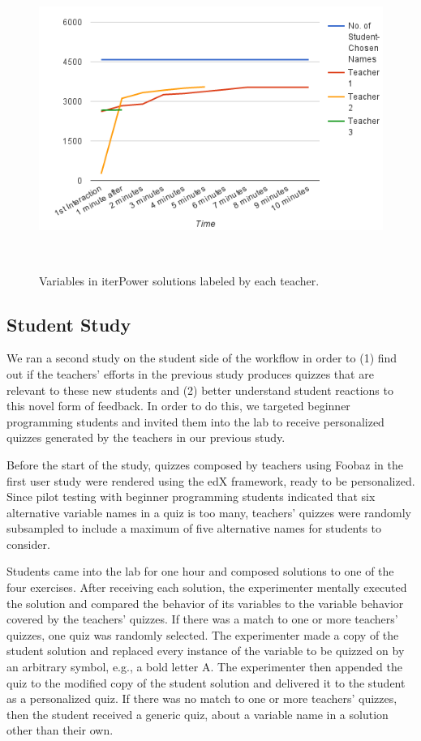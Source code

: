 \begin{figure}
\begin{minipage}{1\columnwidth}
\centering
\includegraphics[width=0.9\columnwidth]{Body/figures/foobaz/variableCoverageNoTitle.png}
\caption{Variables in iterPower solutions labeled by each teacher.}~\label{fig:variableCoverage}
\end{minipage}
\end{figure}

\subsection{Student Study}

We ran a second study on the student side of the workflow in order to (1) find out if the teachers' efforts in the previous study produces quizzes that are relevant to these new students and (2) better understand student reactions to this novel form of feedback. In order to do this, we targeted beginner programming students and invited them into the lab to receive personalized quizzes generated by the teachers in our previous study.

Before the start of the study, quizzes composed by teachers using Foobaz in the first user study were rendered using the edX framework, ready to be personalized. Since pilot testing with beginner programming students indicated that six alternative variable names in a quiz is too many, teachers' quizzes were randomly subsampled to include a maximum of five alternative names for students to consider. 

Students came into the lab for one hour and composed solutions to one of the four exercises. After receiving each solution, the experimenter mentally executed the solution and compared the behavior of its variables to the variable behavior covered by the teachers' quizzes. If there was a match to one or more teachers' quizzes, one quiz was randomly selected. The experimenter made a copy of the student solution and replaced every instance of the variable to be quizzed on by an arbitrary symbol, e.g., a bold letter A. The experimenter then appended the quiz to the modified copy of the student solution and delivered it to the student as a personalized quiz. If there was no match to one or more teachers' quizzes, then the student received a generic quiz, about a variable name in a solution other than their own.

